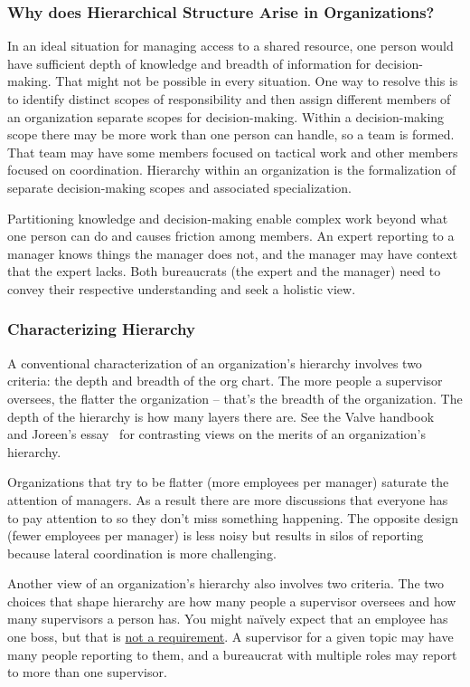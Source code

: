 \subsubsection*{Why does Hierarchical Structure Arise in Organizations?}

In an ideal situation for managing access to a shared resource, one person would have sufficient depth of knowledge and breadth of information for decision-making. 
That might not be possible in every situation. One way to resolve this is to identify distinct scopes of responsibility and then assign different members of an organization separate scopes for decision-making. Within a decision-making scope there may be more work than one person can handle, so a team is formed. That team may have some members focused on tactical work and other members focused on coordination. 
Hierarchy within an organization is the formalization of separate decision-making scopes and associated specialization. 

Partitioning knowledge and decision-making enable complex work beyond what one person can do and causes friction among members. An expert reporting to a manager knows things the manager does not, and the manager may have context that the expert lacks. Both bureaucrats (the expert and the manager) need to convey their respective understanding and seek a holistic view.

\subsubsection*{Characterizing Hierarchy}

A conventional characterization of an organization's hierarchy involves two criteria: the depth and breadth of the \gls{org chart}.
The more people a supervisor oversees, the flatter the organization -- that's the breadth of the organization. The depth of the hierarchy is how many layers there are. See the Valve handbook~\cite{2012_Valve} and Joreen's essay~\cite{1972_Joreen} for contrasting views on the merits of an organization's hierarchy. 

Organizations that try to be flatter (more employees per manager) saturate the attention of managers. As a result there are more discussions that everyone has to pay attention to so they don't miss something happening. The opposite design (fewer employees per manager) is less noisy but results in silos of reporting because lateral coordination is more challenging.

Another view of an organization's hierarchy also involves two criteria. The two choices that shape hierarchy are how many people a supervisor oversees and  how many supervisors a person has. 
You might na\"ively expect that an employee has one boss, but that is \href{https://en.wikipedia.org/wiki/Matrix_management}{not a requirement}.%
\iftoggle{WPinmargin}{\marginpar{$>$Wikipedia: Matrix management}}{}
A supervisor for a given topic may have many people reporting to them, and a bureaucrat with multiple roles may report to more than one supervisor.

